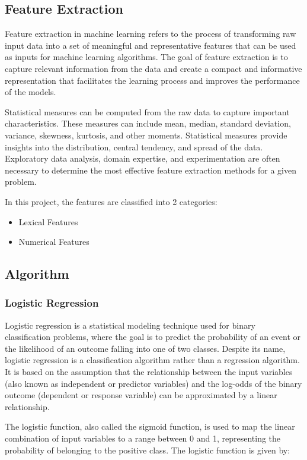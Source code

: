 \subsection{Feature Extraction}
\par Feature extraction in machine learning refers to the process of transforming raw input data into a set of meaningful and representative features that can be used as inputs for machine learning algorithms. The goal of feature extraction is to capture relevant information from the data and create a compact and informative representation that facilitates the learning process and improves the performance of the models.
\par Statistical measures can be computed from the raw data to capture important characteristics. These measures can include mean, median, standard deviation, variance, skewness, kurtosis, and other moments. Statistical measures provide insights into the distribution, central tendency, and spread of the data. Exploratory data analysis, domain expertise, and experimentation are often necessary to determine the most effective feature extraction methods for a given problem.
\par In this project, the features are classified into 2 categories:
\begin{itemize}
    \item Lexical Features
    \item Numerical Features
\end{itemize}

\subsection{Algorithm}

\subsubsection{Logistic Regression}
\par Logistic regression is a statistical modeling technique used for binary classification problems, where the goal is to predict the probability of an event or the likelihood of an outcome falling into one of two classes. Despite its name, logistic regression is a classification algorithm rather than a regression algorithm. It is based on the assumption that the relationship between the input variables (also known as independent or predictor variables) and the log-odds of the binary outcome (dependent or response variable) can be approximated by a linear relationship.
\par The logistic function, also called the sigmoid function, is used to map the linear combination of input variables to a range between 0 and 1, representing the probability of belonging to the positive class. The logistic function is given by:

